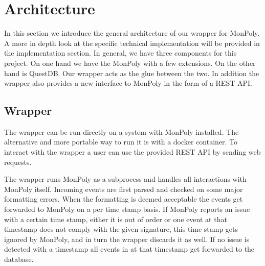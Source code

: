 \chapter{Architecture}

In this section we introduce the general architecture of our wrapper for MonPoly.
A more in depth look at the specific technical implementation will be provided in the implementation section.
In general, we have three components for this project.
On one hand we have the MonPoly with a few extensions.
On the other hand is QuestDB.
Our wrapper acts as the glue between the two.
In addition the wrapper also provides a new interface to MonPoly in the form of a REST API.

% 



\section{Wrapper}

The wrapper can be run directly on a system with MonPoly installed.
The alternative and more portable way to run it is with a docker container.
To interact with the wrapper a user can use the provided REST API by sending web requests.

The wrapper runs MonPoly as a subprocess and handles all interactions with MonPoly itself.
Incoming events are first parsed and checked on some major formatting errors.
When the formatting is deemed acceptable the events get forwarded to MonPoly on a per time stamp basis.
If MonPoly reports an issue with a certain time stamp, either it is out of order or one event at that timestamp does not comply with the given signature, this time stamp gets ignored by MonPoly, and in turn the wrapper discards it as well.
If no issue is detected with a timestamp all events in at that timestamp get forwarded to the database.

% 



